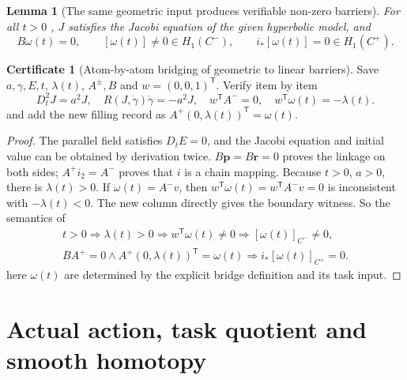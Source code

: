 \documentclass[12pt,a4paper,openany,notitlepage]{report}
\theoremstyle{plain}
\newtheorem{lemma}[theorem]{Lemma}
\theoremstyle{definition}
\newtheorem*{certificate}{Certificate}
\theoremstyle{remark}
\begin{document}
\begin{CJK*}
\begin{lemma}
[The same geometric input produces verifiable non-zero barriers]\label{hgov:lem:jointobstruction}
For all $t>0$ , $J$ satisfies the Jacobi equation of the given hyperbolic model, and \[
B\omega(t)=0,\qquad
[\omega(t)]\ne0\in H_1(C^-),\qquad
i_*[\omega(t)]=0\in H_1(C^+).
\]\end{lemma}
\begin{certificate}
[Atom-by-atom bridging of geometric to linear barriers]Save $a,\gamma,E,t$, $\lambda(t)$, $A^\pm,B$ and $w=(0,0,1)^{\mathsf T}$. Verify item by item \[
D_t^2J=a^2J,\quad R(J,\dot\gamma)\dot\gamma=-a^2J,\quad
w^{\mathsf T}A^-=0,\quad
w^{\mathsf T}\omega(t)=-\lambda(t).
\] and add the new filling record as $A^+(0,\lambda(t))^{\mathsf T}=\omega(t)$.\end{certificate}
\begin{proof}
The parallel field satisfies $D_tE=0$, and the Jacobi equation and initial value can be obtained by derivation twice. $B\mathbf p=B\mathbf r=0$ proves the linkage on both sides; $A^+i_2=A^-$ proves that $i$ is a chain mapping. Because $t>0$, $a>0$, there is $\lambda(t)>0$. If $\omega(t)=A^-v$, then $w^{\mathsf T}\omega(t)=w^{\mathsf T}A^-v=0$ is inconsistent with $-\lambda(t)<0$. The new column directly gives the boundary witness. So the semantics of \[
\begin{gathered}
t>0\Rightarrow\lambda(t)>0
\Rightarrow w^{\mathsf T}\omega(t)\ne0
\Rightarrow[\omega(t)]_{C^-}\ne0,\\
B A^+=0\land A^+(0,\lambda(t))^{\mathsf T}=\omega(t)
\Rightarrow i_*[\omega(t)]_{C^+}=0 .
\end{gathered}
\] here $\omega(t)$ are determined by the explicit bridge definition and its task input.\end{proof}


\section { Actual action, task quotient and smooth homotopy }


\end{CJK*}
\end{document}

